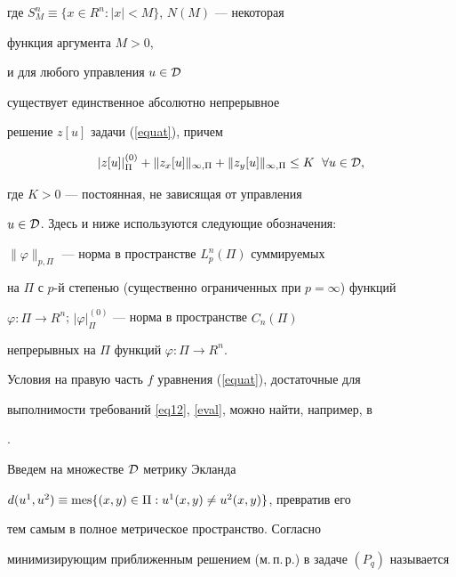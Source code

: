 где $S^n_M\equiv\{x\in R^n : |x|<M\}$, $N(M)$ --- некоторая


функция аргумента $M>0$,


и для любого управления $u\in{\cal D}$


существует единственное абсолютно непрерывное


решение $z[u]$ задачи (\ref{equat}), причем


\begin{equation}\label{eval}


|z[u]|^{(0)}_\Pi+\|z_x[u]\|_{\infty, \Pi}+\|z_y[u]\|_{\infty, \Pi}\leq K  


\ \; \forall  u\in{\cal D},


\end{equation}


где $K>0$ --- постоянная, не зависящая от управления


$u\in{\cal D}$. Здесь и ниже используются следующие обозначения:


$\|\varphi\|_{p, \Pi}$ --- норма в пространстве $L^n_p(\Pi)$ суммируемых 


на $\Pi$ с $p$-й степенью (существенно ограниченных при $p=\infty$) функций


$\varphi :\Pi\to R^n$; $|\varphi|^{(0)}_\Pi$ --- норма в пространстве $C_n(\Pi)$


непрерывных на $\Pi$ функций $\varphi :\Pi\to R^n$.








\begin{notes}


Условия на правую часть $f$ уравнения (\ref{equat}), достаточные для


выполнимости требований \eqref{eq12}, \eqref{eval}, можно найти, например, в


\cite{plotsumv72}.


\end{notes}





Введем на множестве ${\cal D}$ метрику Экланда


$d(u^1, u^2)\equiv \operatorname{mes}\{(x, y)\in\Pi : u^1(x, y)\ne u^2(x, y)\}$, превратив его


тем самым в полное метрическое пространство. Согласно \cite{warga}


минимизирующим приближенным решением (м.\,п.\,р.) в задаче $(P_q)$ называется


